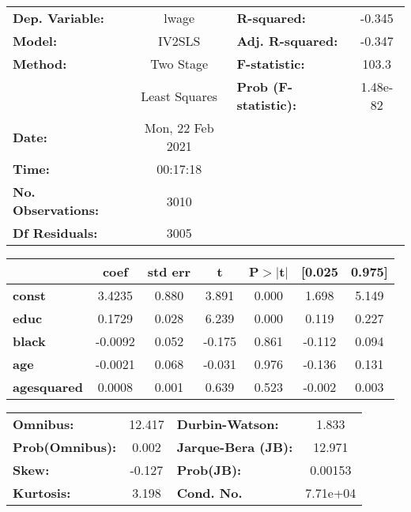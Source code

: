 \begin{center}
\begin{tabular}{lclc}
\toprule
\textbf{Dep. Variable:}    &      lwage       & \textbf{  R-squared:         } &    -0.345   \\
\textbf{Model:}            &      IV2SLS      & \textbf{  Adj. R-squared:    } &    -0.347   \\
\textbf{Method:}           &    Two Stage     & \textbf{  F-statistic:       } &     103.3   \\
\textbf{}                  &  Least Squares   & \textbf{  Prob (F-statistic):} &  1.48e-82   \\
\textbf{Date:}             & Mon, 22 Feb 2021 & \textbf{                     } &             \\
\textbf{Time:}             &     00:17:18     & \textbf{                     } &             \\
\textbf{No. Observations:} &        3010      & \textbf{                     } &             \\
\textbf{Df Residuals:}     &        3005      & \textbf{                     } &             \\
\bottomrule
\end{tabular}
\begin{tabular}{lcccccc}
                    & \textbf{coef} & \textbf{std err} & \textbf{t} & \textbf{P$> |$t$|$} & \textbf{[0.025} & \textbf{0.975]}  \\
\midrule
\textbf{const}      &       3.4235  &        0.880     &     3.891  &         0.000        &        1.698    &        5.149     \\
\textbf{educ}       &       0.1729  &        0.028     &     6.239  &         0.000        &        0.119    &        0.227     \\
\textbf{black}      &      -0.0092  &        0.052     &    -0.175  &         0.861        &       -0.112    &        0.094     \\
\textbf{age}        &      -0.0021  &        0.068     &    -0.031  &         0.976        &       -0.136    &        0.131     \\
\textbf{agesquared} &       0.0008  &        0.001     &     0.639  &         0.523        &       -0.002    &        0.003     \\
\bottomrule
\end{tabular}
\begin{tabular}{lclc}
\textbf{Omnibus:}       & 12.417 & \textbf{  Durbin-Watson:     } &    1.833  \\
\textbf{Prob(Omnibus):} &  0.002 & \textbf{  Jarque-Bera (JB):  } &   12.971  \\
\textbf{Skew:}          & -0.127 & \textbf{  Prob(JB):          } &  0.00153  \\
\textbf{Kurtosis:}      &  3.198 & \textbf{  Cond. No.          } & 7.71e+04  \\
\bottomrule
\end{tabular}
\end{center}

